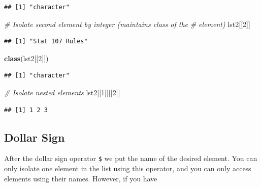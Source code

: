 \documentclass[
]{book}
\newenvironment{Shaded}{\begin{snugshade}}{\end{snugshade}}
\newcommand{\CommentTok}[1]{\textcolor[rgb]{0.56,0.35,0.01}{\textit{#1}}}
\newcommand{\DecValTok}[1]{\textcolor[rgb]{0.00,0.00,0.81}{#1}}
\newcommand{\KeywordTok}[1]{\textcolor[rgb]{0.13,0.29,0.53}{\textbf{#1}}}
\newcommand{\NormalTok}[1]{#1}
\newcommand{\OperatorTok}[1]{\textcolor[rgb]{0.81,0.36,0.00}{\textbf{#1}}}
\begin{document}
\begin{verbatim}
## [1] "character"
\end{verbatim}

\begin{Shaded}
\begin{Highlighting}[]
\CommentTok{# Isolate second element by integer (maintains class of the}
\CommentTok{# element)}
\NormalTok{lst2[[}\DecValTok{2}\NormalTok{]]}
\end{Highlighting}
\end{Shaded}

\begin{verbatim}
## [1] "Stat 107 Rules"
\end{verbatim}

\begin{Shaded}
\begin{Highlighting}[]
\KeywordTok{class}\NormalTok{(lst2[[}\DecValTok{2}\NormalTok{]])}
\end{Highlighting}
\end{Shaded}

\begin{verbatim}
## [1] "character"
\end{verbatim}

\begin{Shaded}
\begin{Highlighting}[]
\CommentTok{# Isolate nested elements}
\NormalTok{lst2[[}\DecValTok{1}\NormalTok{]][[}\DecValTok{2}\NormalTok{]]}
\end{Highlighting}
\end{Shaded}

\begin{verbatim}
## [1] 1 2 3
\end{verbatim}

\hypertarget{dollar-sign}{%
\subsection{Dollar Sign}\label{dollar-sign}}

After the dollar sign operator \texttt{\$} we put the name of the desired element. You can only isolate one element in the list using this operator, and you can only access elements using their names. However, if you have

\begin{Shaded}
\end{Shaded}
\end{document}
